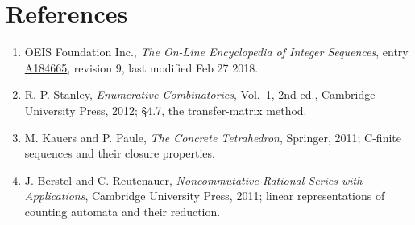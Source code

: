 \documentclass[11pt]{article}
\theoremstyle{definition}
\begin{document}
\section{References}

\begin{enumerate}

\item OEIS Foundation Inc., \emph{The On-Line Encyclopedia of Integer Sequences}, entry \href{https://oeis.org/A184665}{A184665}, revision 9, last modified Feb 27 2018.

\item R. P. Stanley, \emph{Enumerative Combinatorics}, Vol.~1, 2nd ed., Cambridge University Press, 2012; \S4.7, the transfer-matrix method.

\item M. Kauers and P. Paule, \emph{The Concrete Tetrahedron}, Springer, 2011; C-finite sequences and their closure properties.

\item J. Berstel and C. Reutenauer, \emph{Noncommutative Rational Series with Applications}, Cambridge University Press, 2011; linear representations of counting automata and their reduction.

\end{enumerate}
\end{document}
